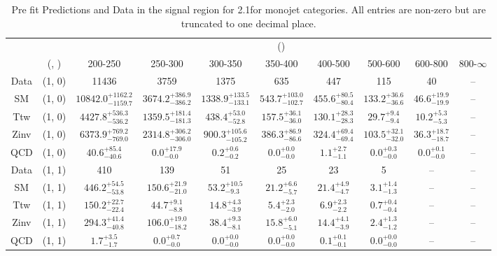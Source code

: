 \begin{table}[h!]
\tiny
\centering
\caption{Pre fit Predictions and Data in the signal region for 2.1\ifb for monojet categories. All entries are non-zero but are truncated to one decimal place.\label{tab:predallqcdnaive_sig_comb_mono}}
\begin{tabular}
{cccccccccc}
	\hline\hline
	&	& \multicolumn{8}{c}{\scalht (\gev)}\\ 
	&	 (\njet, \nb) & 200-250 & 250-300 & 300-350 & 350-400 & 400-500 & 500-600 & 600-800 & 800-$\infty$ \\ [0.8ex] 
\hline
	Data & (1, 0) & 11436 & 3759 & 1375 & 635 & 447 & 115 & 40 & -- \\[0.5ex] 
	SM & (1, 0) & $10842.0^{+ 1162.2 }_{- 1159.7 }$ & $3674.2^{+ 386.9 }_{- 386.2 }$ & $1338.9^{+ 133.5 }_{- 133.1 }$ & $543.7^{+ 103.0 }_{- 102.7 }$ & $455.6^{+ 80.5 }_{- 80.4 }$ & $133.2^{+ 36.6 }_{- 36.6 }$ & $46.6^{+ 19.9 }_{- 19.9 }$ & -- \\[0.5ex] 
	Ttw & (1, 0) & $4427.8^{+ 536.3 }_{- 536.2 }$ & $1359.5^{+ 181.4 }_{- 181.3 }$ & $438.4^{+ 53.0 }_{- 52.8 }$ & $157.5^{+ 36.1 }_{- 36.0 }$ & $130.1^{+ 28.3 }_{- 28.3 }$ & $29.7^{+ 9.4 }_{- 9.4 }$ & $10.2^{+ 5.3 }_{- 5.3 }$ & -- \\[0.5ex] 
	Zinv & (1, 0) & $6373.9^{+ 769.2 }_{- 769.0 }$ & $2314.8^{+ 306.2 }_{- 306.0 }$ & $900.3^{+ 105.6 }_{- 105.2 }$ & $386.3^{+ 86.9 }_{- 86.6 }$ & $324.4^{+ 69.4 }_{- 69.4 }$ & $103.5^{+ 32.1 }_{- 32.0 }$ & $36.3^{+ 18.7 }_{- 18.7 }$ & -- \\[0.5ex] 
	QCD & (1, 0) & $40.6^{+ 85.4 }_{- 40.6 }$ & $0.0^{+ 17.9 }_{- 0.0 }$ & $0.2^{+ 0.6 }_{- 0.2 }$ & $0.0^{+ 0.0 }_{- 0.0 }$ & $1.1^{+ 2.7 }_{- 1.1 }$ & $0.0^{+ 0.3 }_{- 0.0 }$ & $0.0^{+ 0.1 }_{- 0.0 }$ & -- \\[0.5ex] 
	Data & (1, 1) & 410 & 139 & 51 & 25 & 23 & 5 & -- & -- \\[0.5ex] 
	SM & (1, 1) & $446.2^{+ 54.5 }_{- 53.8 }$ & $150.6^{+ 21.9 }_{- 21.0 }$ & $53.2^{+ 10.5 }_{- 9.3 }$ & $21.2^{+ 6.6 }_{- 5.7 }$ & $21.4^{+ 4.9 }_{- 4.7 }$ & $3.1^{+ 1.4 }_{- 1.3 }$ & -- & -- \\[0.5ex] 
	Ttw & (1, 1) & $150.2^{+ 22.7 }_{- 22.4 }$ & $44.7^{+ 9.1 }_{- 8.8 }$ & $14.8^{+ 4.3 }_{- 3.9 }$ & $5.4^{+ 2.3 }_{- 2.0 }$ & $6.9^{+ 2.3 }_{- 2.2 }$ & $0.7^{+ 0.4 }_{- 0.4 }$ & -- & -- \\[0.5ex] 
	Zinv & (1, 1) & $294.3^{+ 41.4 }_{- 40.8 }$ & $106.0^{+ 19.0 }_{- 18.2 }$ & $38.4^{+ 9.3 }_{- 8.1 }$ & $15.8^{+ 6.0 }_{- 5.1 }$ & $14.4^{+ 4.1 }_{- 3.9 }$ & $2.4^{+ 1.3 }_{- 1.2 }$ & -- & -- \\[0.5ex] 
	QCD & (1, 1) & $1.7^{+ 3.5 }_{- 1.7 }$ & $0.0^{+ 0.7 }_{- 0.0 }$ & $0.0^{+ 0.0 }_{- 0.0 }$ & $0.0^{+ 0.0 }_{- 0.0 }$ & $0.1^{+ 0.1 }_{- 0.1 }$ & $0.0^{+ 0.0 }_{- 0.0 }$ & -- & -- \\[0.5ex] 
	\hline
	\hline
\end{tabular}
\end{table}
